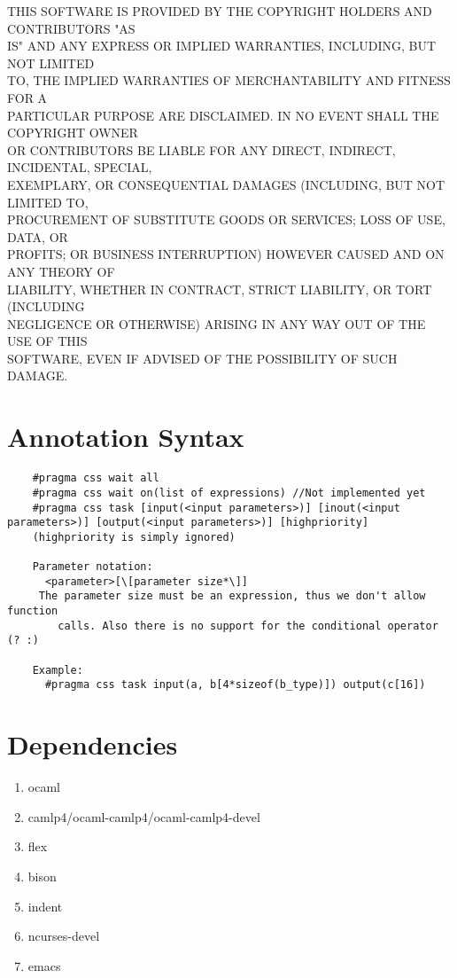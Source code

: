 \documentclass[letterpaper]{article}
\begin{document}
THIS SOFTWARE IS PROVIDED BY THE COPYRIGHT HOLDERS AND CONTRIBUTORS "AS\\
IS" AND ANY EXPRESS OR IMPLIED WARRANTIES, INCLUDING, BUT NOT LIMITED\\
TO, THE IMPLIED WARRANTIES OF MERCHANTABILITY AND FITNESS FOR A\\
PARTICULAR PURPOSE ARE DISCLAIMED. IN NO EVENT SHALL THE COPYRIGHT OWNER\\
OR CONTRIBUTORS BE LIABLE FOR ANY DIRECT, INDIRECT, INCIDENTAL, SPECIAL,\\
EXEMPLARY, OR CONSEQUENTIAL DAMAGES (INCLUDING, BUT NOT LIMITED TO,\\
PROCUREMENT OF SUBSTITUTE GOODS OR SERVICES; LOSS OF USE, DATA, OR\\
PROFITS; OR BUSINESS INTERRUPTION) HOWEVER CAUSED AND ON ANY THEORY OF\\
LIABILITY, WHETHER IN CONTRACT, STRICT LIABILITY, OR TORT (INCLUDING\\
NEGLIGENCE OR OTHERWISE) ARISING IN ANY WAY OUT OF THE USE OF THIS\\
SOFTWARE, EVEN IF ADVISED OF THE POSSIBILITY OF SUCH DAMAGE.\\

\section{Annotation Syntax}

\begin{verbatim}
    #pragma css wait all
    #pragma css wait on(list of expressions) //Not implemented yet
    #pragma css task [input(<input parameters>)] [inout(<input parameters>)] [output(<input parameters>)] [highpriority]
    (highpriority is simply ignored)

    Parameter notation:
      <parameter>[\[parameter size*\]]
     The parameter size must be an expression, thus we don't allow function
        calls. Also there is no support for the conditional operator (? :)

    Example:
      #pragma css task input(a, b[4*sizeof(b_type)]) output(c[16])
\end{verbatim}


\section{Dependencies}

\begin{enumerate}
  \item ocaml
  \item camlp4/ocaml-camlp4/ocaml-camlp4-devel
  \item flex
  \item bison
  \item indent
  \item ncurses-devel
  \item emacs
\end{enumerate}
\end{document}
